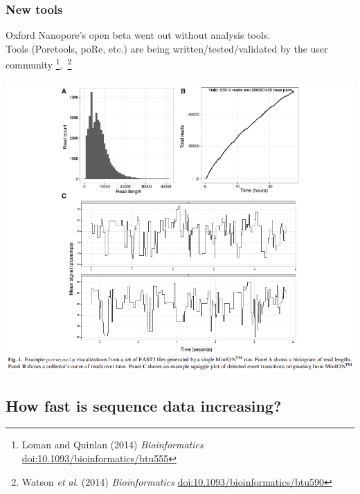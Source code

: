 \begin{frame}
  \frametitle{New tools}
  Oxford Nanopore's open beta went out without analysis tools.\\
  Tools (Poretools, poRe, etc.) are being written/tested/validated by the user community%
  \footnote{\tiny{Loman and Quinlan (2014) \textit{Bioinformatics} \href{http://dx.doi.org/10.1093/bioinformatics/btu555}{doi:10.1093/bioinformatics/btu555}}}$,$%
  \footnote{\tiny{Watson \textit{et al}. (2014) \textit{Bioinformatics} \href{http://dx.doi.org/10.1093/bioinformatics/btu590}{doi:10.1093/bioinformatics/btu590}}}
    \begin{center}
      \includegraphics[height=0.55\textheight]{images/poretools}
    \end{center}           
\end{frame}

\subsection{How fast is sequence data increasing?}

